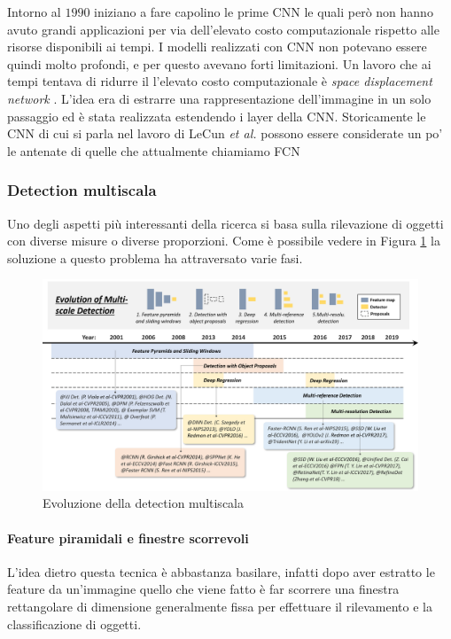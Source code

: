Intorno al $1990$ iniziano a fare capolino le prime \ac{CNN} \cite{vaillant1994original} le quali però non hanno avuto grandi applicazioni per via dell'elevato costo computazionale rispetto alle risorse disponibili ai tempi. I modelli realizzati con \ac{CNN} non potevano essere quindi molto profondi, e per questo avevano forti limitazioni. Un lavoro che ai tempi tentava di ridurre il l'elevato costo computazionale è \textit{space displacement network} \cite{lecun1998gradient}. L'idea era di estrarre una rappresentazione dell'immagine in un solo passaggio ed è stata realizzata estendendo i layer della \ac{CNN}. Storicamente le \ac{CNN} di cui si parla nel lavoro di LeCun \textit{et al.} possono essere considerate un po' le antenate di quelle che attualmente chiamiamo \ac{FCN} \cite{long2015fully} \cite{chen2014semantic}
\subsubsection{Detection multiscala}
\label{subsec:multiscale_detection}
Uno degli aspetti più interessanti della ricerca si basa sulla rilevazione di oggetti con diverse misure o diverse proporzioni. Come è possibile vedere in Figura \ref{fig:multi_scale_history} la soluzione a questo problema ha attraversato varie fasi.
\begin{figure}
    \centering
    \includegraphics[width=\textwidth]{images/evol-multiscale.png}
    \caption{Evoluzione della detection multiscala \cite{DBLP:journals/corr/abs-1905-05055}}
    \label{fig:multi_scale_history}
\end{figure}
\paragraph{Feature piramidali e finestre scorrevoli}
L'idea dietro questa tecnica è abbastanza basilare, infatti dopo aver estratto le feature da un'immagine quello che viene fatto è far scorrere una finestra rettangolare di dimensione generalmente fissa per effettuare il rilevamento e la classificazione di oggetti. 

